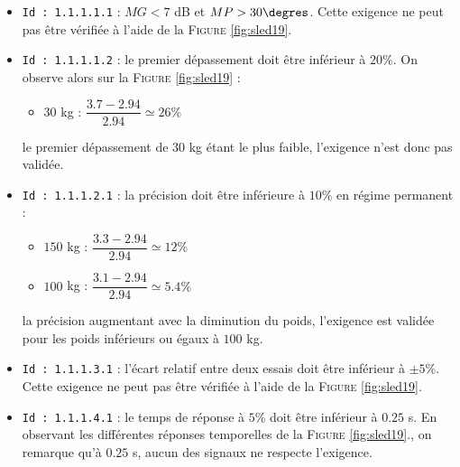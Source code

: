 \ifprof
\begin{corrige}
\begin{itemize}
\item \texttt{Id : 1.1.1.1.1} : $M G < 7$ dB et $M P > 30\degres$. Cette exigence ne peut pas être vérifiée à l'aide de la \textsc{Figure} \ref{fig:sled19}.\\

\item \texttt{Id : 1.1.1.1.2} : le premier dépassement doit être inférieur à $20\%$. On observe alors sur la \textsc{Figure} \ref{fig:sled19} :

	\begin{itemize}
	\item $30$ kg : $\dfrac{3.7-2.94}{2.94} \simeq 26\%$\\
	\end{itemize}

le premier dépassement de $30$ kg étant le plus faible, l'exigence n'est donc pas validée.\\

\item \texttt{Id : 1.1.1.2.1} : la précision doit être inférieure à $10\%$ en régime permanent :

	\begin{itemize}
	\item $150$ kg : $\dfrac{3.3-2.94}{2.94} \simeq 12\%$

	\item $100$ kg : $\dfrac{3.1-2.94}{2.94} \simeq 5.4\%$\\
	\end{itemize}

la précision augmentant avec la diminution du poids, l'exigence est validée pour les poids inférieurs ou égaux à $100$ kg.\\
 
\item \texttt{Id : 1.1.1.3.1} : l'écart relatif entre deux essais doit être inférieur à $\pm5\%$. Cette exigence ne peut pas être vérifiée à l'aide de la \textsc{Figure} \ref{fig:sled19}.\\

\item \texttt{Id : 1.1.1.4.1} : le temps de réponse à $5$\% doit être inférieur à $0.25$ s. En observant les différentes réponses temporelles de la \textsc{Figure} \ref{fig:sled19}., on remarque qu'à $0.25$ s, aucun des signaux ne respecte l'exigence.
\end{itemize}

\end{corrige}
\else
\fi

